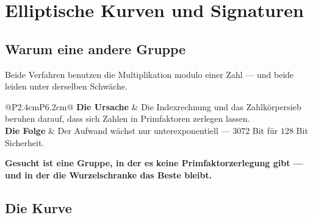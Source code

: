 \chapter{Elliptische Kurven und Signaturen}

\section{Warum eine andere Gruppe}

\begin{merksatz}
Beide Verfahren benutzen die Multiplikation modulo einer Zahl --- und beide leiden unter derselben Schwäche.

\begin{center}
{\small
\renewcommand{\arraystretch}{1.5}
\begin{tabular}{@{}P{2.4cm}P{6.2cm}@{}}
\toprule
\textbf{Die Ursache} & Die Indexrechnung und das Zahlkörpersieb beruhen darauf, dass sich Zahlen in Primfaktoren zerlegen lassen.\\
\textbf{Die Folge} & Der Aufwand wächst nur unterexponentiell --- $3072$ Bit für $128$ Bit Sicherheit.\\
\bottomrule
\end{tabular}}
\end{center}

\begin{center}
\begin{minipage}{0.9\textwidth}
\textbf{Gesucht ist eine Gruppe, in der es keine Primfaktorzerlegung gibt --- und in der die Wurzelschranke das Beste bleibt.}
\end{minipage}
\end{center}

\begin{center}
\begin{minipage}{0.88\textwidth}
\end{minipage}
\end{center}
\end{merksatz}

\section{Die Kurve}

